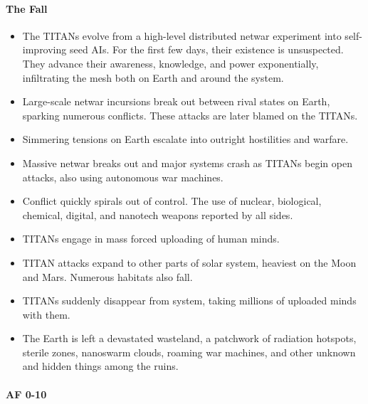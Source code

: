 \paragraph{ The Fall} 

\begin{itemize}
\item The TITANs evolve from a high-level distributed netwar experiment into self-improving seed AIs. For the first few days, their existence is unsuspected. They advance their awareness, knowledge, and power exponentially, infiltrating the mesh both on Earth and around the system.
\item Large-scale netwar incursions break out between rival states on Earth, sparking numerous conflicts. These attacks are later blamed on the TITANs.
\item Simmering tensions on Earth escalate into outright hostilities and warfare.
\item Massive netwar breaks out and major systems crash as TITANs begin open attacks, also using autonomous war machines.
\item Conflict quickly spirals out of control. The use of nuclear, biological, chemical, digital, and nanotech weapons reported by all sides.
\item TITANs engage in mass forced uploading of human minds.
\item TITAN attacks expand to other parts of solar system, heaviest on the Moon and Mars. Numerous habitats also fall.
\item TITANs suddenly disappear from system, taking millions of uploaded minds with them.
\item The Earth is left a devastated wasteland, a patchwork of radiation hotspots, sterile zones, nanoswarm clouds, roaming war machines, and other unknown and hidden things among the ruins.
\end{itemize} 

\paragraph{AF 0-10} 

